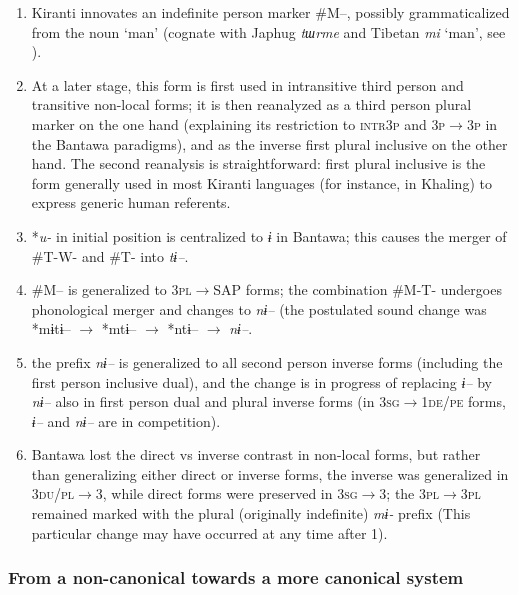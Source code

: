 \documentclass[twoside,a4paper,11pt]{article}
\newcommand{\ipa}[1]{{\phon\textit{#1}}}
\newcommand{\Σ}{\greek{Σ}}
\begin{document}
\begin{enumerate}


\item  Kiranti innovates an indefinite person marker \#M--, possibly grammaticalized from the noun `man' (cognate with Japhug \ipa{tɯrme} and Tibetan \ipa{mi} `man', see \citealt{driem93agreement}).  

\item At a later stage, this form is first used in intransitive third person and transitive non-local forms; it is then reanalyzed as a third person plural marker on the one hand (explaining its restriction to \textsc{intr3p} and \textsc{3p$\rightarrow$3p} in the Bantawa paradigms), and as the inverse first plural inclusive on the other hand. The second reanalysis is straightforward: first plural inclusive is the form generally used in most Kiranti languages (for instance, in Khaling) to express generic human referents.

\item  *\ipa{u-} in initial position is centralized to \ipa{ɨ} in Bantawa; this causes the merger of \#T-W- and \#T- into \ipa{tɨ--}.

\item  \#M-- is generalized to \textsc{3pl}$\rightarrow$SAP forms;  the combination \#M-T- undergoes phonological merger and changes to \ipa{nɨ--} (the postulated sound change was *mɨtɨ-- $\rightarrow$ *mtɨ-- $\rightarrow$ *ntɨ-- $\rightarrow$  \ipa{nɨ--}. 

\item the prefix \ipa{nɨ--} is generalized to all second person inverse forms (including the first person inclusive dual), and the change is in progress of replacing \ipa{ɨ--} by \ipa{nɨ--} also in  first person dual and plural inverse forms (in \textsc{3sg$\rightarrow$1de/pe} forms, \ipa{ɨ--} and  \ipa{nɨ--} are in competition). 

\item Bantawa lost the direct vs inverse contrast in non-local forms, but rather than generalizing either direct or inverse forms, the inverse was generalized in \textsc{3du/pl}$\rightarrow$3, while direct forms were preserved in \textsc{3sg}$\rightarrow$3; the \textsc{3pl$\rightarrow$3pl} remained marked with the plural (originally indefinite) \ipa{mɨ-} prefix (This particular change may have occurred at any time after 1).
\end{enumerate}

\subsubsection{From a non-canonical towards a more canonical system}
\end{document}
